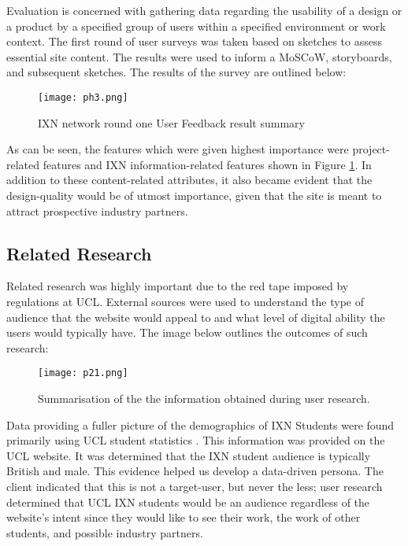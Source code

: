 \documentclass[fontsize=11pt]{extarticle}
\numberwithin{figure}{section} %
\numberwithin{table}{section}%
\begin{document}
Evaluation is concerned with gathering data regarding the usability of a
design or a product by a specified group of users within a specified
environment or work context. The first round of user surveys was taken
based on sketches to assess essential site content. The results were
used to inform a MoSCoW, storyboards, and subsequent sketches. The
results of the survey are outlined below:

\begin{figure}[H]
      \centering
      \texttt{[image: ph3.png]}
      \caption{IXN network round one User Feedback result summary}
\label{userfeedback}
 \end{figure}

As can be seen, the features which were given highest importance were
project-related features and IXN information-related features shown in
Figure \ref{userfeedback}. In addition to these content-related
attributes, it also became evident that the design-quality would be of
utmost importance, given that the site is meant to attract prospective
industry partners.

\hypertarget{related-research}{%
\subsection{Related Research}\label{related-research}}

Related research was highly important due to the red tape imposed by
regulations at UCL. External sources were used to understand the type of
audience that the website would appeal to and what level of digital
ability the users would typically have. The image below outlines the
outcomes of such research:

\begin{figure}[H]
      \centering
      \texttt{[image: p21.png]}
      \caption{Summarisation of the the information obtained during user research.}
 \end{figure}

Data providing a fuller picture of the demographics of IXN Students were
found primarily using UCL student statistics \cite{ps1}. This
information was provided on the UCL website. It was determined that the
IXN student audience is typically British and male. This evidence helped
us develop a data-driven persona. The client indicated that this is not
a target-user, but never the less; user research determined that UCL IXN
students would be an audience regardless of the website's intent since
they would like to see their work, the work of other students, and
possible industry partners.
\end{document}
